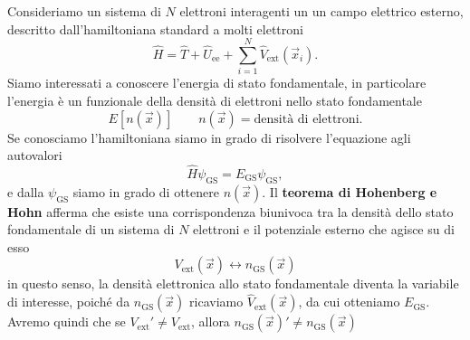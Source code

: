 \begin{theorem}
    Consideriamo un sistema di $N$ elettroni interagenti un un campo elettrico esterno, descritto dall'hamiltoniana standard a molti elettroni
    \begin{equation*}
        \hat H = \hat T + \hat U_{\text{ee}} + \sum_{i=1}^N \hat V_{\text{ext}}(\vec{x}_i).
    \end{equation*}
    Siamo interessati a conoscere l'energia di stato fondamentale, in particolare l'energia è un funzionale della densità di elettroni nello stato fondamentale
    \begin{equation*}
        E\left[n(\vec x)\right] \qquad n(\vec x)= \text{densità di elettroni}.
    \end{equation*}
    Se conosciamo l'hamiltoniana siamo in grado di risolvere l'equazione agli autovalori
    \begin{equation*}
        \hat H \psi_{\text{GS}}=E_{\text{GS}}\psi_{\text{GS}},
    \end{equation*}
    e dalla $\psi_{\text{GS}}$ siamo in grado di ottenere $n(\vec x)$. Il \textbf{teorema di Hohenberg e Hohn} afferma che esiste una corrispondenza biunivoca tra la densità dello stato fondamentale di un sistema di $N$ elettroni e il potenziale esterno che agisce su di esso
    \begin{equation*}
        V_{\text{ext}}(\vec x)\longleftrightarrow n_{\text{GS}}(\vec x)
    \end{equation*}
    in questo senso, la densità elettronica allo stato fondamentale diventa la variabile di interesse, poiché da $n_{\text{GS}}(\vec x)$ ricaviamo $\hat V_{\text{ext}}(\vec x)$, da cui otteniamo $E_{\text{GS}}$. Avremo quindi che se $V_{\text{ext}}'\neq V_{\text{ext}}$, allora $n_{\text{GS}}(\vec x)'\neq n_{\text{GS}}(\vec x)$
\end{theorem}

